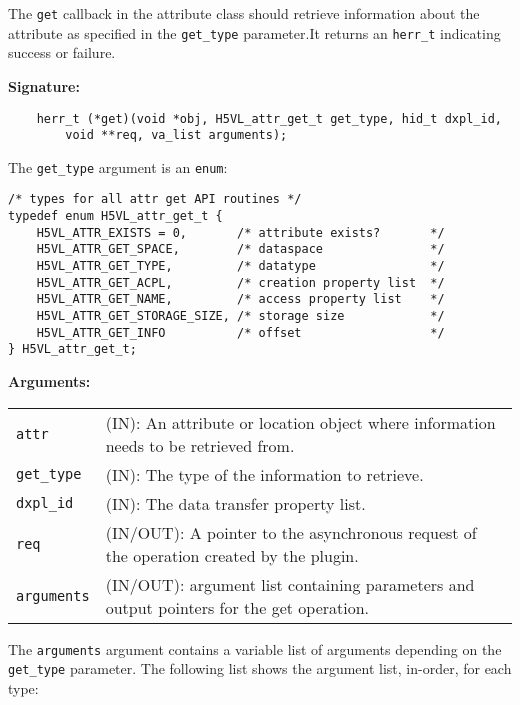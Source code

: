 The {\tt get} callback in the attribute class should retrieve
information about the attribute as specified in the {\tt get\_type}
parameter.It returns an {\tt herr\_t} indicating success or failure.

\textbf{Signature:}
\begin{lstlisting}
    herr_t (*get)(void *obj, H5VL_attr_get_t get_type, hid_t dxpl_id, 
        void **req, va_list arguments);
\end{lstlisting}

The {\tt get\_type} argument is an {\tt enum}:
\begin{lstlisting}
/* types for all attr get API routines */
typedef enum H5VL_attr_get_t {
    H5VL_ATTR_EXISTS = 0,       /* attribute exists?       */
    H5VL_ATTR_GET_SPACE,        /* dataspace               */
    H5VL_ATTR_GET_TYPE,         /* datatype                */
    H5VL_ATTR_GET_ACPL,         /* creation property list  */
    H5VL_ATTR_GET_NAME,         /* access property list    */
    H5VL_ATTR_GET_STORAGE_SIZE, /* storage size            */
    H5VL_ATTR_GET_INFO          /* offset                  */
} H5VL_attr_get_t;
\end{lstlisting}

\textbf{Arguments:}\\
\begin{tabular}{l p{10cm}}
  {\tt attr} & (IN): An attribute or location object where information
  needs to be retrieved from.\\
  {\tt get\_type} & (IN): The type of the information to retrieve.\\
  {\tt dxpl\_id} & (IN): The data transfer property list.\\
  {\tt req} & (IN/OUT): A pointer to the asynchronous request of the
  operation created by the plugin.\\
  {\tt arguments} & (IN/OUT): argument list containing parameters and
  output pointers for the get operation. \\
\end{tabular}

The {\tt arguments} argument contains a variable list of arguments
depending on the {\tt get\_type} parameter. The following list shows
the argument list, in-order, for each type:

